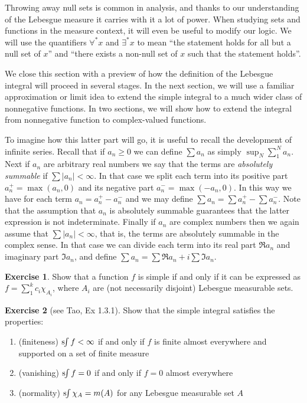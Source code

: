 \documentclass[11pt,oneside]{amsbook}
\newcommand{\sint}{\text{s}\kern-3pt\int}
\theoremstyle{definition}
\newtheorem{exerc}{Exercise}[section]
\theoremstyle{plain}
\theoremstyle{definition}
\theoremstyle{remark}
\numberwithin{equation}{section}
\numberwithin{figure}{section}
\begin{document}
Throwing away null sets is common in analysis, and thanks to our understanding of the Lebesgue measure it carries with it a lot of power. When studying sets and functions in the measure context, it will even be useful to modify our logic. We will use the quantifiers $\forall^*x$ and $\exists^*x$ to mean ``the statement holds for all but a null set of $x$'' and ``there exists a non-null set of $x$ such that the statement holds''.

We close this section with a preview of how the definition of the Lebesgue integral will proceed in several stages. In the next section, we will use a familiar approximation or limit idea to extend the simple integral to a much wider class of nonnegative functions. In two sections, we will show how to extend the integral from nonnegative function to complex-valued functions.

To imagine how this latter part will go, it is useful to recall the development of infinite series. Recall that if $a_n\geq0$ we can define $\sum a_n$ as simply $\sup_N\sum_1^Na_n$. Next if $a_n$ are arbitrary real numbers we say that the terms are \emph{absolutely summable} if $\sum|a_n|<\infty$. In that case we split each term into its positive part $a_n^+=\max(a_n,0)$ and its negative part $a_n^-=\max(-a_n,0)$. In this way we have for each term $a_n=a_n^+-a_n^-$ and we may define $\sum a_n=\sum a_n^+-\sum a_n^-$. Note that the assumption that $a_n$ is absolutely summable guarantees that the latter expression is not indeterminate. Finally if $a_n$ are complex numbers then we again assume that $\sum|a_n|<\infty$, that is, the terms are absolutely summable in the complex sense. In that case we can divide each term into its real part $\Re a_n$ and imaginary part $\Im a_n$, and define $\sum a_n=\sum\Re a_n+i\sum\Im a_n$.


\begin{exerc}
  Show that a function $f$ is simple if and only if it can be expressed as $f=\sum_1^kc_i\chi_{A_i}$, where $A_i$ are (not necessarily disjoint) Lebesgue measurable sets.
\end{exerc}

\begin{exerc}[see Tao, Ex 1.3.1]
  Show that the simple integral satisfies the properties:
  \begin{enumerate}
    \item (finiteness) $\sint f<\infty$ if and only if $f$ is finite almost everywhere and supported on a set of finite measure
    \item (vanishing) $\sint f=0$ if and only if $f=0$ almost everywhere
    \item (normality) $\sint\chi_A=m(A)$ for any Lebesgue measurable set $A$
  \end{enumerate}
\end{exerc}
\end{document}
